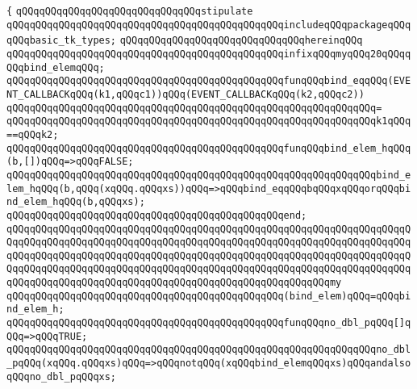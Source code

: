 \verb|{|\newline
\verb|qQQqqQQqqQQqqQQqqQQqqQQqqQQqqQQqstipulate|\newline
\newline
\verb|qQQqqQQqqQQqqQQqqQQqqQQqqQQqqQQqqQQqqQQqqQQqqQQqincludeqQQqpackageqQQqqQQqbasic_tk_types;|\newline
\newline
\verb|qQQqqQQqqQQqqQQqqQQqqQQqqQQqqQQqhereinqQQq|\newline
\newline
\verb|qQQqqQQqqQQqqQQqqQQqqQQqqQQqqQQqqQQqqQQqqQQqqQQqinfixqQQqmyqQQq20qQQqqQQqbind_elemqQQq;|\newline
\newline
\verb|qQQqqQQqqQQqqQQqqQQqqQQqqQQqqQQqqQQqqQQqqQQqqQQqfunqQQqbind_eqqQQq(EVENT_CALLBACKqQQq(k1,qQQqc1))qQQq(EVENT_CALLBACKqQQq(k2,qQQqc2))|\newline
\verb|qQQqqQQqqQQqqQQqqQQqqQQqqQQqqQQqqQQqqQQqqQQqqQQqqQQqqQQqqQQqqQQq=|\newline
\verb|qQQqqQQqqQQqqQQqqQQqqQQqqQQqqQQqqQQqqQQqqQQqqQQqqQQqqQQqqQQqqQQqk1qQQq==qQQqk2;|\newline
\newline
\verb|qQQqqQQqqQQqqQQqqQQqqQQqqQQqqQQqqQQqqQQqqQQqqQQqfunqQQqbind_elem_hqQQq(b,[])qQQq=>qQQqFALSE;|\newline
\verb|qQQqqQQqqQQqqQQqqQQqqQQqqQQqqQQqqQQqqQQqqQQqqQQqqQQqqQQqqQQqqQQqbind_elem_hqQQq(b,qQQq(xqQQq.qQQqxs))qQQq=>qQQqbind_eqqQQqbqQQqxqQQqorqQQqbind_elem_hqQQq(b,qQQqxs);|\newline
\verb|qQQqqQQqqQQqqQQqqQQqqQQqqQQqqQQqqQQqqQQqqQQqqQQqend;|\newline
\verb|qQQqqQQqqQQqqQQqqQQqqQQqqQQqqQQqqQQqqQQqqQQqqQQqqQQqqQQqqQQqqQQqqQQqqQQqqQQqqQQqqQQqqQQqqQQqqQQqqQQqqQQqqQQqqQQqqQQqqQQqqQQqqQQqqQQqqQQqqQQqqQQqqQQqqQQqqQQqqQQqqQQqqQQqqQQqqQQqqQQqqQQqqQQqqQQqqQQqqQQqqQQqqQQqqQQqqQQqqQQqqQQqqQQqqQQqqQQqqQQqqQQqqQQqqQQqqQQqqQQqqQQqqQQqqQQqqQQqqQQqqQQqqQQqqQQqqQQqqQQqqQQqqQQqqQQqqQQqqQQqqQQqqQQqqQQqqQQqmy|\newline
\verb|qQQqqQQqqQQqqQQqqQQqqQQqqQQqqQQqqQQqqQQqqQQqqQQq(bind_elem)qQQq=qQQqbind_elem_h;|\newline
\newline
\verb|qQQqqQQqqQQqqQQqqQQqqQQqqQQqqQQqqQQqqQQqqQQqqQQqfunqQQqno_dbl_pqQQq[]qQQq=>qQQqTRUE;|\newline
\verb|qQQqqQQqqQQqqQQqqQQqqQQqqQQqqQQqqQQqqQQqqQQqqQQqqQQqqQQqqQQqqQQqno_dbl_pqQQq(xqQQq.qQQqxs)qQQq=>qQQqnotqQQq(xqQQqbind_elemqQQqxs)qQQqandalsoqQQqno_dbl_pqQQqxs;|\newline
